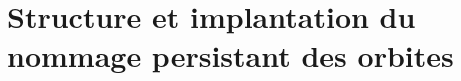 
\section{Structure et implantation du nommage persistant des orbites}
\label{sec:implantation-nomination-persistante-orbites}



